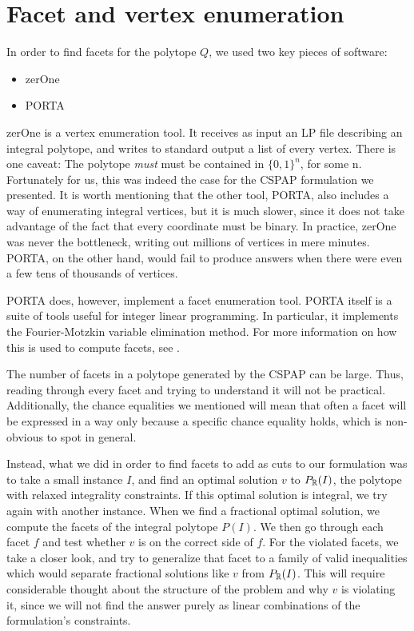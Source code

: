 \section{Facet and vertex enumeration}
\label{app:facets}

In order to find facets for the polytope $Q$, we used two key pieces of software:
\begin{itemize}
\item zerOne\cite{Bussieck:1998:VSS:302316.302321}
\item PORTA\cite{PORTA}
\end{itemize}

zerOne is a vertex enumeration tool. It receives as input an LP file describing an integral polytope, and writes to standard output a list of every vertex. There is one caveat: The polytope \emph{must} must be contained in $\{0, 1\}^n$, for some n. Fortunately for us, this was indeed the case for the CSPAP formulation we presented. It is worth mentioning that the other tool, PORTA, also includes a way of enumerating integral vertices, but it is much slower, since it does not take advantage of the fact that every coordinate must be binary. In practice, zerOne was never the bottleneck, writing out millions of vertices in mere minutes. PORTA, on the other hand, would fail to produce answers when there were even a few tens of thousands of vertices.

PORTA does, however, implement a facet enumeration tool. PORTA itself is a suite of tools useful for integer linear programming. In particular, it implements the Fourier-Motzkin variable elimination method. For more information on how this is used to compute facets, see \cite{z-lop-95}.

The number of facets in a polytope generated by the CSPAP can be large. Thus, reading through every facet and trying to understand it will not be practical. Additionally, the chance equalities we mentioned will mean that often a facet will be expressed in a way only because a specific chance equality holds, which is non-obvious to spot in general.

Instead, what we did in order to find facets to add as cuts to our formulation was to take a small instance $I$, and find an optimal solution $v$ to $P_{\mathbb{R}}(I)$, the polytope with relaxed integrality constraints. If this optimal solution is integral, we try again with another instance. When we find a fractional optimal solution, we compute the facets of the integral polytope $P(I)$. We then go through each facet $f$ and test whether $v$ is on the correct side of $f$. For the violated facets, we take a closer look, and try to generalize that facet to a family of valid inequalities which would separate fractional solutions like $v$ from $P_{\mathbb{R}}(I)$. This will require considerable thought about the structure of the problem and why $v$ is violating it, since we will not find the answer purely as linear combinations of the formulation's constraints.

